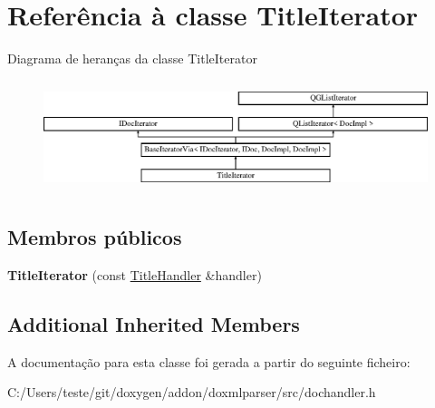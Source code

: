 \hypertarget{class_title_iterator}{\section{Referência à classe Title\-Iterator}
\label{class_title_iterator}
}
Diagrama de heranças da classe Title\-Iterator\begin{figure}[H]
\begin{center}
\leavevmode
\includegraphics[height=3.294118cm]{class_title_iterator}
\end{center}
\end{figure}
\subsection*{Membros públicos}
\begin{DoxyCompactItemize}
\item 
\hypertarget{class_title_iterator_af53fe12fdf00400dda8c024a284df65b}{{\bfseries Title\-Iterator} (const \hyperlink{class_title_handler}{Title\-Handler} \&handler)}\label{class_title_iterator_af53fe12fdf00400dda8c024a284df65b}

\end{DoxyCompactItemize}
\subsection*{Additional Inherited Members}


A documentação para esta classe foi gerada a partir do seguinte ficheiro\-:\begin{DoxyCompactItemize}
\item 
C\-:/\-Users/teste/git/doxygen/addon/doxmlparser/src/dochandler.\-h\end{DoxyCompactItemize}
